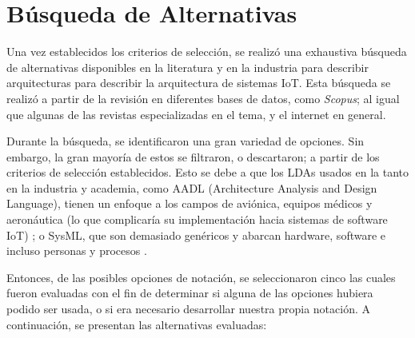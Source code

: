 \section{Búsqueda de Alternativas}

Una vez establecidos los criterios de selección, se realizó una exhaustiva búsqueda de alternativas disponibles en la literatura y en la industria para describir arquitecturas para describir la arquitectura de sistemas IoT. Esta búsqueda se realizó a partir de la revisión en diferentes bases de datos, como \textit{Scopus}; al igual que algunas de las revistas especializadas en el tema, y el internet en general.

Durante la búsqueda, se identificaron una gran variedad de opciones. Sin embargo, la gran mayoría de estos se filtraron, o descartaron; a partir de los criterios de selección establecidos. Esto se debe a que los LDAs usados en la tanto en la industria y academia, como AADL (Architecture Analysis and Design Language), tienen un enfoque a los campos de aviónica, equipos médicos y aeronáutica (lo que complicaría su implementación hacia sistemas de software IoT) \cite{aadl_web, aadl_pdf}; o SysML, que son demasiado genéricos y abarcan hardware, software e incluso personas y procesos \cite{omgsysml_2015}.

Entonces, de las posibles opciones de notación, se seleccionaron cinco las cuales fueron evaluadas con el fin de determinar si alguna de las opciones hubiera podido ser usada, o si era necesario desarrollar nuestra propia notación. A continuación, se presentan las alternativas evaluadas:

